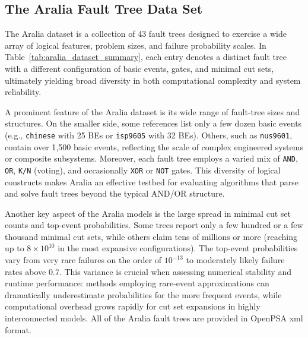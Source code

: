 \subsection{The Aralia Fault Tree Data Set}
\label{subsec:aralia_dataset}

The Aralia dataset is a collection of 43 fault trees designed to exercise a wide array of logical features, problem sizes, and failure probability scales. In Table~\ref{tab:aralia_dataset_summary}, each entry denotes a distinct fault tree with a different configuration of basic events, gates, and minimal cut sets, ultimately yielding broad diversity in both computational complexity and system reliability.

A prominent feature of the Aralia dataset is its wide range of fault-tree sizes and structures. On the smaller side, some references list only a few dozen basic events (e.g., \texttt{chinese} with 25 BEs or \texttt{isp9605} with 32 BEs). Others, such as \texttt{nus9601}, contain over 1{,}500 basic events, reflecting the scale of complex engineered systems or composite subsystems. Moreover, each fault tree employs a varied mix of \texttt{AND}, \texttt{OR}, \texttt{K/N} (voting), and occasionally \texttt{XOR} or \texttt{NOT} gates. This diversity of logical constructs makes Aralia an effective testbed for evaluating algorithms that parse and solve fault trees beyond the typical AND/OR structure.

Another key aspect of the Aralia models is the large spread in minimal cut set counts and top-event probabilities. Some trees report only a few hundred or a few thousand minimal cut sets, while others claim tens of millions or more (reaching up to \(8\times 10^{10}\) in the most expansive configurations). The top-event probabilities vary from very rare failures on the order of \(10^{-13}\) to moderately likely failure rates above 0.7. This variance is crucial when assessing numerical stability and runtime performance: methods employing rare-event approximations can dramatically underestimate probabilities for the more frequent events, while computational overhead grows rapidly for cut set expansions in highly interconnected models. All of the Aralia fault trees are provided in OpenPSA \acrfull{xml} format.
